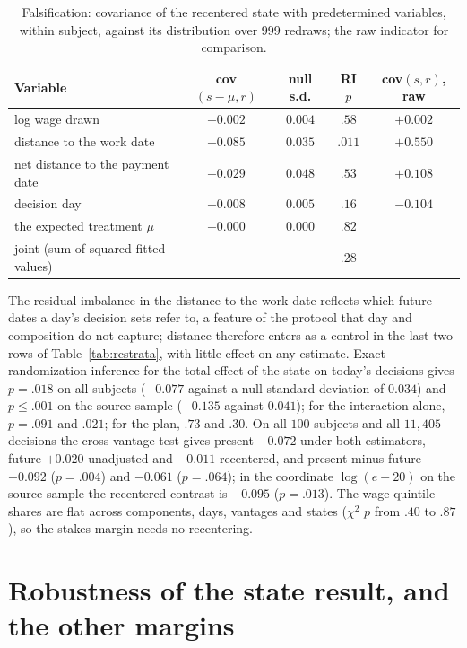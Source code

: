 \documentclass[11pt,a4paper]{article}
\theoremstyle{plain}
\theoremstyle{definition}
\begin{document}
\begin{table}[H]\centering
\caption{Falsification: covariance of the recentered state with predetermined variables, within subject, against its
distribution over $999$ redraws; the raw indicator for comparison.}
\label{tab:rcfals}
{\footnotesize
\begin{tabular}{lcccc}
\toprule
Variable & cov$(s-\mu,r)$ & null s.d. & RI $p$ & cov$(s,r)$, raw \\
\midrule
log wage drawn & $-0.002$ & $0.004$ & $.58$ & $+0.002$ \\
distance to the work date & $+0.085$ & $0.035$ & $.011$ & $+0.550$ \\
net distance to the payment date & $-0.029$ & $0.048$ & $.53$ & $+0.108$ \\
decision day & $-0.008$ & $0.005$ & $.16$ & $-0.104$ \\
the expected treatment $\mu$ & $-0.000$ & $0.000$ & $.82$ & \\
joint (sum of squared fitted values) & & & $.28$ & \\
\bottomrule
\end{tabular}}
\end{table}

\noindent The residual imbalance in the distance to the work date reflects which future dates a day's decision sets
refer to, a feature of the protocol that day and composition do not capture; distance therefore enters as a control
in the last two rows of Table~\ref{tab:rcstrata}, with little effect on any estimate. Exact randomization inference
for the total effect of the state on today's decisions gives $p=.018$ on all subjects ($-0.077$ against a null
standard deviation of $0.034$) and $p\le.001$ on the source sample ($-0.135$ against $0.041$); for the interaction
alone, $p=.091$ and $.021$; for the plan, $.73$ and $.30$. On all $100$ subjects and all $11{,}405$ decisions the cross-vantage test gives present $-0.072$
under both estimators, future $+0.020$ unadjusted and $-0.011$ recentered, and present minus future $-0.092$
($p=.004$) and $-0.061$ ($p=.064$); in the coordinate $\log(e+20)$ on the source sample the recentered contrast is
$-0.095$ ($p=.013$). The wage-quintile shares are flat across components, days, vantages and states ($\chi^2$ $p$
from $.40$ to $.87$), so the stakes margin needs no recentering.

\section{Robustness of the state result, and the other margins}
\label{app:robust}
\end{document}
